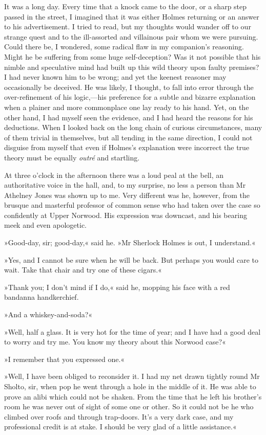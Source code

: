 It was a long day. Every time that a knock came to the door, or a sharp step passed in the street, I imagined that it was either Holmes returning or an answer to his advertisement. I tried to read, but my thoughts would wander off to our strange quest and to the ill-assorted and villainous pair whom we were pursuing. Could there be, I wondered, some radical flaw in my companion's reasoning. Might he be suffering from some huge self-deception? Was it not possible that his nimble and speculative mind had built up this wild theory upon faulty premises? I had never known him to be wrong; and yet the keenest reasoner may occasionally be deceived. He was likely, I thought, to fall into error through the over-refinement of his logic,—his preference for a subtle and bizarre explanation when a plainer and more commonplace one lay ready to his hand. Yet, on the other hand, I had myself seen the evidence, and I had heard the reasons for his deductions. When I looked back on the long chain of curious circumstances, many of them trivial in themselves, but all tending in the same direction, I could not disguise from myself that even if Holmes's explanation were incorrect the true theory must be equally \textit{outré} and startling.

At three o'clock in the afternoon there was a loud peal at the bell, an authoritative voice in the hall, and, to my surprise, no less a person than Mr Athelney Jones was shown up to me. Very different was he, however, from the brusque and masterful professor of common sense who had taken over the case so confidently at Upper Norwood. His expression was downcast, and his bearing meek and even apologetic.

»Good-day, sir; good-day,« said he. »Mr Sherlock Holmes is out, I understand.«

»Yes, and I cannot be sure when he will be back. But perhaps you would care to wait. Take that chair and try one of these cigars.«

»Thank you; I don't mind if I do,« said he, mopping his face with a red bandanna handkerchief.

»And a whiskey-and-soda?«

»Well, half a glass. It is very hot for the time of year; and I have had a good deal to worry and try me. You know my theory about this Norwood case?«

»I remember that you expressed one.«

»Well, I have been obliged to reconsider it. I had my net drawn tightly round Mr Sholto, sir, when pop he went through a hole in the middle of it. He was able to prove an alibi which could not be shaken. From the time that he left his brother's room he was never out of sight of some one or other. So it could not be he who climbed over roofs and through trap-doors. It's a very dark case, and my professional credit is at stake. I should be very glad of a little assistance.«

